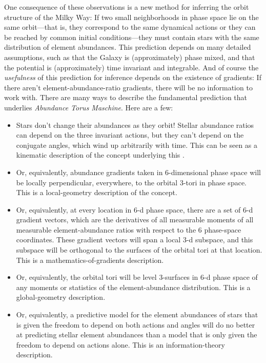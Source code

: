 \documentclass[modern]{aastex63}
\newcommand{\methodname}{\textsl{Abundance Torus Maschine}}
\newcommand{\methodname}{\textsl{Torus--Tangents Topography}}
\begin{document}
One consequence of these observations is a new method for inferring
the orbit structure of the Milky Way:
If two small neighborhoods in phase space lie on the same orbit---that
is, they correspond to the same dynamical actions or they can be reached
by common initial conditions---they must contain stars with the same distribution of
element abundances.
This prediction depends on many detailed assumptions, such as that
the Galaxy is (approximately) phase mixed, and that the potential is
(approximately) time invariant and integrable.
And of course the \emph{usefulness} of this prediction for inference
depends on the existence of gradients: If there aren't
element-abundance-ratio gradients, there will be no information to work
with.
There are many ways to describe the fundamental prediction that underlies \methodname.
Here are a few:
\begin{itemize}
\item
  Stars don't change their abundances as they orbit!  Stellar
  abundance ratios can depend on the three invariant actions, but they
  can't depend on the conjugate angles, which wind up arbitrarily with time.
  This can be seen as a kinematic description of the concept underlying this \documentname.
\item
  Or, equivalently, abundance gradients taken in 6-dimensional phase space will be
  locally perpendicular, everywhere, to the orbital 3-tori in phase space.
  This is a local-geometry description of the concept.
\item
  Or, equivalently, at every location in 6-d phase space, there are a set of 6-d
  gradient vectors, which are the derivatives of all measurable
  moments of all measurable element-abundance ratios with respect to
  the 6 phase-space coordinates. These gradient vectors will span a
  local 3-d subspace, and this subspace will be orthogonal to the surfaces
  of the orbital tori at that location.
  This is a mathematics-of-gradients description.
\item
  Or, equivalently, the orbital tori will be level 3-surfaces in 6-d phase space of any
  moments or statistics of the element-abundance distribution.
  This is a global-geometry description.
\item
  Or, equivalently, a predictive model for the element abundances of stars
  that is given the freedom to depend on both actions and angles will do no
  better at predicting stellar element abundances than a model that is only
  given the freedom to depend on actions alone.
  This is an information-theory description.
\end{itemize}
\end{document}
